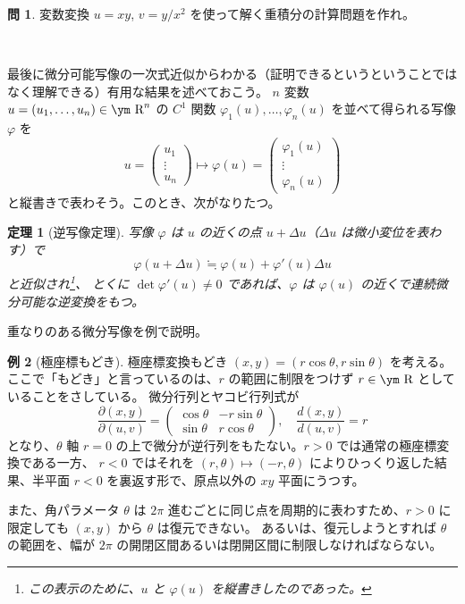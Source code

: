 \documentclass[a4paper]{jsarticle}
\newtheorem{Theorem}{定理}[section]
\theoremstyle{definition}
\newtheorem{Example}[Theorem]{例}
\newtheorem{Exercise}{問}%
\theoremstyle{remark}
\newcommand{\R}{\text{\ym R}}
\begin{document}
\begin{Exercise}
変数変換 $u = xy$, $v = y/x^2$ を使って解く重積分の計算問題を作れ。
\end{Exercise}　

最後に微分可能写像の一次式近似からわかる（証明できるというということではなく理解できる）有用な結果を述べておこう。
$n$ 変数 $u= (u_1,\dots,u_n) \in \R^n$ の $C^1$ 関数 $\varphi_1(u), \dots,\varphi_n(u)$ を並べて得られる写像 $\varphi$ を
\[
  u =
  \begin{pmatrix}
    u_1\\
    \vdots\\
    u_n
  \end{pmatrix}
  \mapsto
  \varphi(u) =
    \begin{pmatrix}
      \varphi_1(u)\\
      \vdots\\
      \varphi_n(u)
    \end{pmatrix}
\]
と縦書きで表わそう。このとき、次がなりたつ。

\begin{Theorem}[逆写像定理]
  写像 $\varphi$ は $u$ の近くの点 $u + \Delta u$（$\Delta u$ は微小変位を表わす）で
  \[
    \varphi(u+\Delta u) \fallingdotseq \varphi(u) + \varphi'(u) \Delta u
  \]
  と近似され\footnote{この表示のために、$u$ と $\varphi(u)$ を縦書きしたのであった。}、
  とくに $\det \varphi'(u) \not= 0$ であれば、$\varphi$ は $\varphi(u)$ の近くで連続微分可能な逆変換をもつ。
\end{Theorem}

重なりのある微分写像を例で説明。


\begin{Example}[極座標もどき]
  極座標変換もどき $(x,y) = (r\cos\theta,r\sin\theta)$ を考える。ここで「もどき」と言っているのは、$r$ の範囲に制限をつけず $r \in \R$ としていることをさしている。
  微分行列とヤコビ行列式が
  \[
    \frac{\partial(x,y)}{\partial(u,v)} =
    \begin{pmatrix}
      \cos\theta & -r\sin\theta\\
      \sin\theta & r\cos\theta
    \end{pmatrix},
    \quad
    \frac{d(x,y)}{d(u,v)} = r
 \]
 となり、$\theta$ 軸 $r=0$ の上で微分が逆行列をもたない。$r>0$ では通常の極座標変換である一方、
 $r<0$ ではそれを $(r,\theta) \mapsto (-r,\theta)$ によりひっくり返した結果、半平面 $r<0$ を裏返す形で、原点以外の $xy$ 平面にうつす。
 
 また、角パラメータ $\theta$ は $2\pi$ 進むごとに同じ点を周期的に表わすため、$r>0$ に限定しても $(x,y)$ から $\theta$ は復元できない。
 あるいは、復元しようとすれば $\theta$ の範囲を、幅が $2\pi$ の開閉区間あるいは閉開区間に制限しなければならない。
\end{Example}
\end{document}
